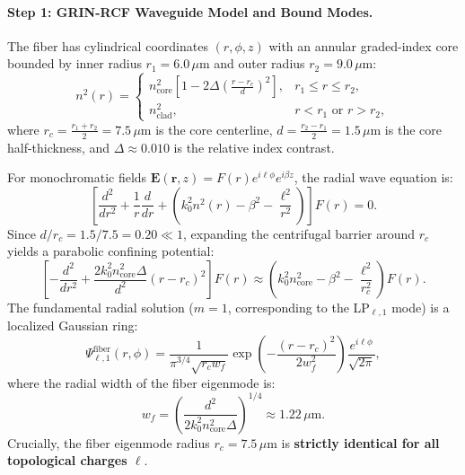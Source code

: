 \documentclass[11pt,a4paper]{article}
\begin{document}
\paragraph{Step 1: GRIN-RCF Waveguide Model and Bound Modes.}
The fiber has cylindrical coordinates $(r, \phi, z)$ with an annular graded-index core bounded by inner radius $r_1 = 6.0\,\mu\text{m}$ and outer radius $r_2 = 9.0\,\mu\text{m}$:
\begin{equation}
n^2(r) = \begin{cases}
n_{\text{core}}^2 \left[ 1 - 2\Delta \left( \frac{r - r_c}{d} \right)^2 \right], & r_1 \le r \le r_2, \\
n_{\text{clad}}^2, & r < r_1 \text{ or } r > r_2,
\end{cases}
\label{eq:rcf_profile}
\end{equation}
where $r_c = \frac{r_1 + r_2}{2} = 7.5\,\mu\text{m}$ is the core centerline, $d = \frac{r_2 - r_1}{2} = 1.5\,\mu\text{m}$ is the core half-thickness, and $\Delta \approx 0.010$ is the relative index contrast.

For monochromatic fields $\mathbf{E}(\mathbf{r}, z) = F(r) e^{i \ell \phi} e^{i \beta z}$, the radial wave equation is:
\begin{equation}
\left[ \frac{d^2}{dr^2} + \frac{1}{r} \frac{d}{dr} + \left( k_0^2 n^2(r) - \beta^2 - \frac{\ell^2}{r^2} \right) \right] F(r) = 0.
\label{eq:radial_wave_rcf}
\end{equation}
Since $d / r_c = 1.5 / 7.5 = 0.20 \ll 1$, expanding the centrifugal barrier around $r_c$ yields a parabolic confining potential:
\begin{equation}
\left[ - \frac{d^2}{dr^2} + \frac{2 k_0^2 n_{\text{core}}^2 \Delta}{d^2} (r - r_c)^2 \right] F(r) \approx \left( k_0^2 n_{\text{core}}^2 - \beta^2 - \frac{\ell^2}{r_c^2} \right) F(r).
\label{eq:radial_parabolic_potential}
\end{equation}
The fundamental radial solution ($m=1$, corresponding to the LP$_{\ell, 1}$ mode) is a localized Gaussian ring:
\begin{equation}
\Psi_{\ell, 1}^{\text{fiber}}(r, \phi) = \frac{1}{\pi^{3/4} \sqrt{r_c w_f}} \exp\left( - \frac{(r - r_c)^2}{2 w_f^2} \right) \frac{e^{i \ell \phi}}{\sqrt{2\pi}},
\label{eq:fiber_eigenmode}
\end{equation}
where the radial width of the fiber eigenmode is:
\begin{equation}
w_f = \left( \frac{d^2}{2 k_0^2 n_{\text{core}}^2 \Delta} \right)^{1/4} \approx 1.22\,\mu\text{m}.
\label{eq:fiber_wf}
\end{equation}
Crucially, the fiber eigenmode radius $r_c = 7.5\,\mu\text{m}$ is \textbf{strictly identical for all topological charges $\ell$}.
\end{document}
